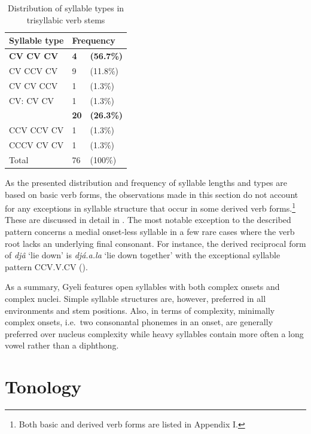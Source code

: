 \begin{table} 
\centering
\begin{tabular}{l|ll}
Syllable type & \multicolumn{2}{l}{Frequency} \\  \midrule
{\bfseries CV	CV	CV}	&	{\bfseries 4}	&  {\bfseries (56.7\%)} \\
CV	CCV	CV	&	9	&  (11.8\%) \\
CV	CV	CCV	&	1	&  (1.3\%) \\
CV:	CV	CV	&	1	&  (1.3\%) \\
\hdashline[0.5pt/5pt]
{\bfseries CCV	CV	CV}	&	{\bfseries 20}	&  {\bfseries (26.3\%)} \\
CCV	CCV	CV	&	1	&  (1.3\%) \\
\hdashline[0.5pt/5pt] 
CCCV CV	CV	&	1	&  (1.3\%) \\
 \midrule
Total			&	76	&  (100\%) \\
\end{tabular}
\caption{Distribution of syllable types in trisyllabic verb stems}
\label{Tab:o3SyllVerb}
\end{table} 


As the presented distribution and frequency of syllable lengths and types are based on basic verb forms, the observations made in this section do not account for any exceptions in syllable structure that occur in some derived verb forms.\footnote{Both basic and derived verb forms are listed in Appendix I.} These are discussed in detail in . The most notable exception to the described pattern concerns a medial onset-less syllable in a few rare cases where the verb root lacks an underlying final consonant.  For instance, the derived reciprocal form of {\itshape djâ} `lie down' is {\itshape djá.a.la} `lie down together' with the exceptional syllable pattern CCV.V.CV ().

As a summary, Gyeli features open syllables with both complex onsets and complex nuclei. Simple syllable structures are, however, preferred in all environments and stem positions. Also, in terms of complexity, minimally complex onsets, i.e.\ two consonantal phonemes in an onset, are generally preferred over nucleus complexity while heavy syllables contain more often a long vowel  rather than a diphthong.






\section{Tonology}
\label{sec:Tonology}

